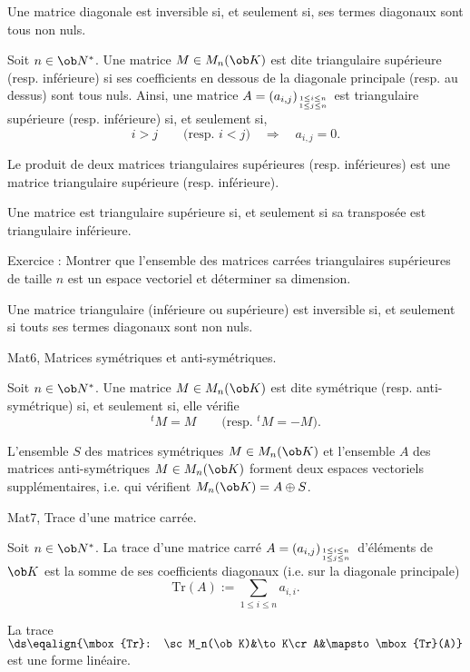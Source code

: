 \Propriete []  Une matrice diagonale est inversible si, et seulement si, ses termes diagonaux sont tous non nuls. 
\bigskip

\Definition []  Soit $n\in\ob N^*$. Une matrice $M\in\sc M_n(\ob K)$ est dite triangulaire supérieure (resp. inférieure) si ses coefficients en dessous de la diagonale principale (resp. au dessus) sont tous nuls. Ainsi, une matrice $A=(a_{i,j})_{1\le i\le n\atop1\le j\le n}$ est triangulaire supérieure (resp. inférieure) si, et seulement si, 
$$
i> j\qquad \mbox{(resp. $i<j$)}\quad \Longrightarrow\quad a_{i,j}=0.
$$

\Propriete []  Le produit de deux matrices triangulaires supérieures (resp. inférieures) est une matrice 
triangulaire supérieure (resp. inférieure). 
\bigskip

\Propriete []  Une matrice est triangulaire supérieure si, et seulement si sa transposée est triangulaire inférieure.
\bigskip 

Exercice :  Montrer que l'ensemble des matrices carrées triangulaires supérieures de taille $n$ est un espace vectoriel et déterminer sa dimension. 
\bigskip

\Propriete []  Une matrice triangulaire (inférieure ou supérieure) est inversible si, et seulement si touts ses termes diagonaux sont non nuls. 
\bigskip


\Subsection Mat6, Matrices symétriques et anti-symétriques. 


\Definition []  Soit $n\in\ob N^*$. Une matrice $M\in\sc M_n(\ob K)$ est dite symétrique (resp. anti-symétrique) 
si, et seulement si, elle vérifie 
$$
^tM=M\qquad \mbox{(resp. $^tM=-M$)}.
$$ 


\Propriete []  L'ensemble $S$ des matrices symétriques $M\in\sc M_n(\ob K)$ et l'ensemble $A$ des matrices anti-symétriques $M\in\sc M_n(\ob K)$ forment deux espaces vectoriels supplémentaires, i.e. qui vérifient $\sc M_n(\ob K)=A\oplus S$. 
\bigskip



\Subsection Mat7, Trace d'une matrice carrée. 


\Definition []  Soit $n\in\ob N^*$. La trace d'une matrice carré $A=(a_{i,j})_{1\le i\le n\atop1\le j\le n}$ d'éléments de $\ob K$ est la somme de ses coefficients diagonaux (i.e. sur la diagonale principale) 
$$
\mbox{Tr}(A):=\sum_{1\le i\le n}a_{i,i}.
$$ 

\Theoreme [$n\in\ob N^*$]
La trace $\ds \eqalign{\mbox{Tr}: \sc M_n(\ob K)&\to K\cr  A&\mapsto  \mbox{Tr}(A)}$ est une forme linéaire. 

